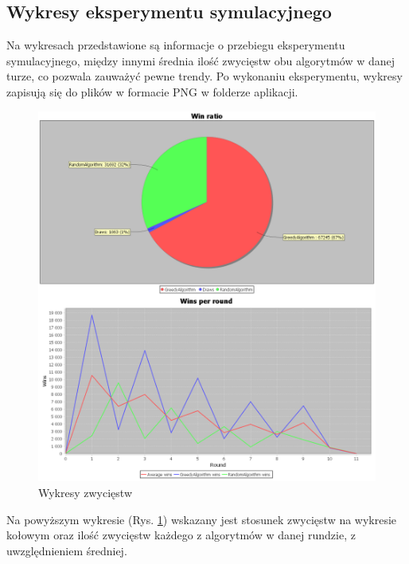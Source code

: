 \subsection*{Wykresy eksperymentu symulacyjnego}
Na wykresach przedstawione są informacje o przebiegu eksperymentu symulacyjnego, między innymi średnia ilość zwycięstw obu algorytmów w danej turze, co pozwala zauważyć pewne trendy. Po wykonaniu eksperymentu, wykresy zapisują się do plików w formacie PNG w folderze aplikacji.
\begin{figure}[H]
	\centering
	\includegraphics[width=\textwidth]{Resources/winCharts.PNG}
	\caption{Wykresy zwycięstw} 
	\label{fig:winChart}
\end{figure}

Na powyższym wykresie (Rys. \ref{fig:winChart}) wskazany jest stosunek zwycięstw na wykresie kołowym oraz ilość zwycięstw każdego z algorytmów w danej rundzie, z uwzględnieniem średniej.

